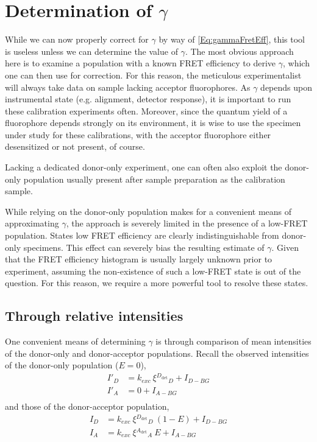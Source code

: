 \documentclass{article}
\newcommand{\dt}[1]{\ensuremath{^{#1_\mathrm{det}}}}   %
\begin{document}
\section{Determination of $\gamma$}
While we can now properly correct for $\gamma$ by way of
\eqref{Eq:gammaFretEff}, this tool is useless unless we can determine
the value of $\gamma$. The most obvious approach here is to examine a
population with a known FRET efficiency to derive $\gamma$, which one
can then use for correction. For this reason, the meticulous
experimentalist will always take data on sample lacking acceptor
fluorophores. As $\gamma$ depends upon instrumental state
(e.g. alignment, detector response), it is important to run these
calibration experiments often. Moreover, since the quantum yield of a
fluorophore depends strongly on its environment, it is wise to use the
specimen under study for these calibrations, with the acceptor
fluorophore either desensitized or not present, of course.

Lacking a dedicated donor-only experiment, one can often also
exploit the donor-only population usually present after sample
preparation as the calibration sample.

While relying on the donor-only population makes for a convenient
means of approximating $\gamma$, the approach is severely limited in
the presence of a low-FRET population. States low FRET efficiency are
clearly indistinguishable from donor-only specimens. This effect can
severely bias the resulting estimate of $\gamma$. Given that the FRET
efficiency histogram is usually largely unknown prior to experiment,
assuming the non-existence of such a low-FRET state is out of the
question. For this reason, we require a more powerful tool to resolve
these states.

\subsection{Through relative intensities}

One convenient means of determining $\gamma$ is through comparison of 
mean intensities of the donor-only and donor-acceptor populations. 
Recall the observed intensities of the donor-only population ($E=0$),
\begin{align*}
I'_D & = k_{exc} ~ \xi\dt{D}_D + I_{D-BG} \\
I'_A & = 0                         + I_{A-BG} \\
\end{align*}
and those of the donor-acceptor population,
\begin{align*}
I_D & = k_{exc} ~ \xi\dt{D}_D ~ (1 - E) + I_{D-BG} \\
I_A & = k_{exc} ~ \xi\dt{A}_A ~ E       + I_{A-BG} 
\end{align*}
\end{document}
